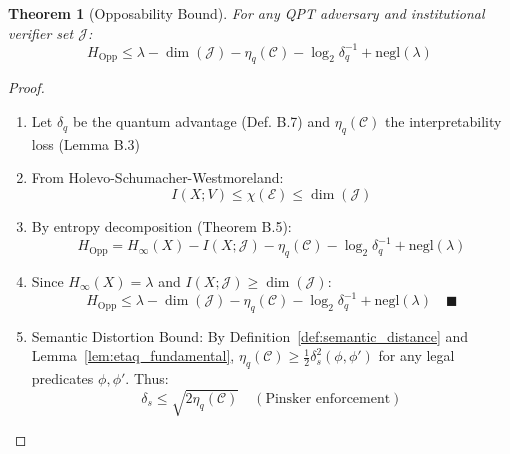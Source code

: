 \documentclass[preprint,12pt]{elsarticle}
\newtheorem{theorem}{Theorem}[section]
\newcommand{\negl}{\mathrm{negl}}
\begin{document}
                \begin{theorem}[Opposability Bound]\label{thm:opp-bounds}
                    For any QPT adversary and institutional verifier set $\mathcal{J}$:
                    \begin{equation}\label{eq:opp-bounds}
                    H_{\text{Opp}} \leq \lambda - \dim(\mathcal{J}) - \eta_q(\mathcal{C}) - \log_2 \delta_q^{-1} + \negl(\lambda)
                    \end{equation}
                \end{theorem}

                \begin{proof}\label{pr:opp-bounds}
                    \begin{enumerate}
                        \item Let $\delta_q$ be the quantum advantage (Def. B.7) and $\eta_q(\mathcal{C})$ the interpretability loss (Lemma B.3)

                        \item From Holevo-Schumacher-Westmoreland:
                       \begin{equation}\label{eq:opp-bounds1}
                        I(X;V) \leq \chi(\mathcal{E}) \leq \dim(\mathcal{J})
                        \end{equation}

                        \item By entropy decomposition (Theorem B.5):
                        \begin{equation}\label{eq:opp-bounds2}
                        H_{\text{Opp}} = H_\infty(X) - I(X; \mathcal{J}) - \eta_q(\mathcal{C}) - \log_2 \delta_q^{-1} + \negl(\lambda)
                        \end{equation}

                        \item Since $H_\infty(X) = \lambda$ and $I(X; \mathcal{J}) \geq \dim(\mathcal{J})$:
                        \begin{equation}\label{eq:opp-bounds3}
                        H_{\text{Opp}} \leq \lambda - \dim(\mathcal{J}) - \eta_q(\mathcal{C}) - \log_2 \delta_q^{-1} + \negl(\lambda) \quad \blacksquare
                        \end{equation}
                        \item Semantic Distortion Bound:
                        By Definition~\ref{def:semantic_distance} and Lemma~\ref{lem:etaq_fundamental}, $\eta_q(\mathcal{C}) \geq \frac{1}{2}\delta_s^2(\phi,\phi')$ for any legal predicates $\phi,\phi'$. Thus:
                        \[
                        \delta_s \leq \sqrt{2\eta_q(\mathcal{C})} \quad (\text{Pinsker enforcement})
                        \]
                    \end{enumerate}
                    
                \end{proof}
\end{document}
